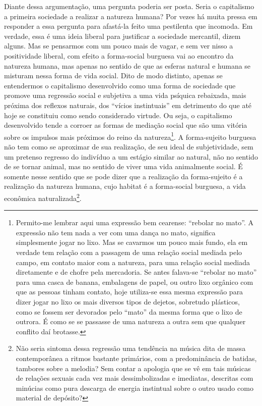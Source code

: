 Diante dessa argumentação, uma pergunta poderia ser posta. Seria o
capitalismo a primeira sociedade a realizar a natureza humana? Por vezes
há muita pressa em responder a essa pergunta para afastá-la feito uma
pestilenta que incomoda. Em verdade, essa é uma ideia liberal para
justificar a sociedade mercantil, dizem alguns. Mas se pensarmos com um
pouco mais de vagar, e sem ver nisso a positividade liberal, com efeito
a forma-social burguesa vai ao encontro da natureza humana, mas apenas
no sentido de que as esferas natural e humana se misturam nessa forma de
vida social. Dito de modo distinto, apenas se entendermos o capitalismo
desenvolvido como uma forma de sociedade que promove uma regressão
social e subjetiva a uma vida psíquica rebaixada, mais próxima dos
reflexos naturais, dos ``vícios instintuais'' em detrimento do que até
hoje se constituiu como sendo considerado virtude. Ou seja, o
capitalismo desenvolvido tende a corroer as formas de mediação social
que são uma vitória sobre os impulsos mais próximos do reino da
natureza\footnote{Permito-me lembrar aqui uma expressão bem cearense:
  ``rebolar no mato''. A expressão não tem nada a ver com uma dança no
  mato, significa simplesmente jogar no lixo. Mas se cavarmos um pouco
  mais fundo, ela em verdade tem relação com a passagem de uma relação
  social mediada pelo campo, em contato maior com a natureza, para uma
  relação social mediada diretamente e de chofre pela mercadoria. Se
  antes falava-se ``rebolar no mato'' para uma casca de banana,
  embalagens de papel, ou outro lixo orgânico com que as pessoas tinham
  contato, hoje utiliza-se essa mesma expressão para dizer jogar no lixo
  os mais diversos tipos de dejetos, sobretudo plásticos, como se fossem
  ser devorados pelo ``mato'' da mesma forma que o lixo de outrora. É
  como se se passasse de uma natureza a outra sem que qualquer conflito
  daí brotasse.}. A forma-sujeito burguesa não tem como se aproximar de
sua realização, de seu ideal de subjetividade, sem um pretenso regresso
do indivíduo a um estágio similar ao natural, não no sentido de se
tornar animal, mas no sentido de viver uma vida animalmente social. É
somente nesse sentido que se pode dizer que a realização da
forma-sujeito é a realização da natureza humana, cujo habitat é a
forma-social burguesa, a vida econômica naturalizada\footnote{Não seria
  sintoma dessa regressão uma tendência na música dita de massa
  contemporânea a ritmos bastante primários, com a predominância de
  batidas, tambores sobre a melodia? Sem contar a apologia que se vê em
  tais músicas de relações sexuais cada vez mais dessimbolizadas e
  imediatas, descritas com minúcias como pura descarga de energia
  instintual sobre o outro usado como material de depósito?}.

